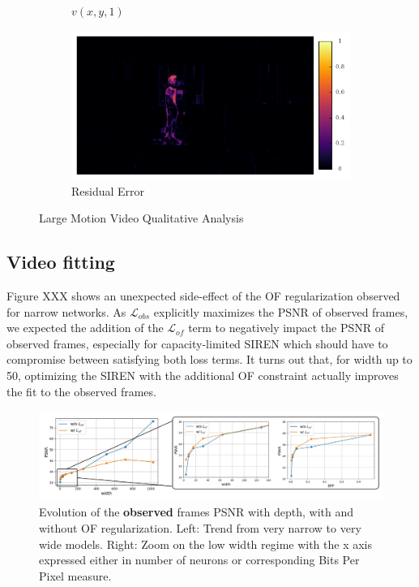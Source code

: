 \documentclass{article}
\begin{document}
\begin{figure}[h]
\begin{subfigure}{0.2\textwidth}
    \caption{$v(x,y,1)$}
\end{subfigure}%
\begin{subfigure}{0.2\textwidth}
	\centering
    \includegraphics[width=1\linewidth]{nd_scene/Skating_error.png}
    \caption{Residual Error}
\end{subfigure}
\caption{Large Motion Video Qualitative Analysis}
\label{fig_large}
\end{figure}


\subsection{Video fitting}

Figure XXX shows an unexpected side-effect of the OF regularization observed for narrow networks.
As $\mathcal{L}_{obs}$ explicitly maximizes the PSNR of observed frames,
we expected the addition of the $\mathcal{L}_{of}$ term to negatively impact the PSNR of observed frames,
especially for capacity-limited SIREN which should have to compromise between satisfying both loss terms.
It turns out that, for width up to 50, optimizing the SIREN with the additional OF constraint
actually improves the fit to the observed frames.

\label{sec_video_fit}
\begin{figure}[h]
\centering
\includegraphics[width=1\textwidth]{compression.png}
\caption{Evolution of the \textbf{observed} frames PSNR with depth, with and without OF regularization.
Left: Trend from very narrow to very wide models.
Right: Zoom on the low width regime with the x axis expressed either in number of neurons or corresponding Bits Per Pixel measure.}
\end{figure}
\end{document}
